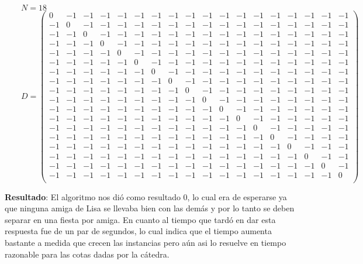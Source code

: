 \begin{flushleft}
$\qquad N = 18$\\[10pt]
$\qquad D = \left( \begin{smallmatrix}
0 & -1 & -1 & -1 & -1 & -1 & -1 & -1 & -1 & -1 & -1 & -1 & -1 & -1 & -1 & -1 & -1 & -1 \\
-1 & 0 & -1 & -1 & -1 & -1 & -1 & -1 & -1 & -1 & -1 & -1 & -1 & -1 & -1 & -1 & -1 & -1 \\
-1 & -1 & 0 & -1 & -1 & -1 & -1 & -1 & -1 & -1 & -1 & -1 & -1 & -1 & -1 & -1 & -1 & -1 \\
-1 & -1 & -1 & 0 & -1 & -1 & -1 & -1 & -1 & -1 & -1 & -1 & -1 & -1 & -1 & -1 & -1 & -1 \\
-1 & -1 & -1 & -1 & 0 & -1 & -1 & -1 & -1 & -1 & -1 & -1 & -1 & -1 & -1 & -1 & -1 & -1 \\
-1 & -1 & -1 & -1 & -1 & 0 & -1 & -1 & -1 & -1 & -1 & -1 & -1 & -1 & -1 & -1 & -1 & -1 \\
-1 & -1 & -1 & -1 & -1 & -1 & 0 & -1 & -1 & -1 & -1 & -1 & -1 & -1 & -1 & -1 & -1 & -1 \\
-1 & -1 & -1 & -1 & -1 & -1 & -1 & 0 & -1 & -1 & -1 & -1 & -1 & -1 & -1 & -1 & -1 & -1 \\
-1 & -1 & -1 & -1 & -1 & -1 & -1 & -1 & 0 & -1 & -1 & -1 & -1 & -1 & -1 & -1 & -1 & -1 \\
-1 & -1 & -1 & -1 & -1 & -1 & -1 & -1 & -1 & 0 & -1 & -1 & -1 & -1 & -1 & -1 & -1 & -1 \\
-1 & -1 & -1 & -1 & -1 & -1 & -1 & -1 & -1 & -1 & 0 & -1 & -1 & -1 & -1 & -1 & -1 & -1 \\
-1 & -1 & -1 & -1 & -1 & -1 & -1 & -1 & -1 & -1 & -1 & 0 & -1 & -1 & -1 & -1 & -1 & -1 \\
-1 & -1 & -1 & -1 & -1 & -1 & -1 & -1 & -1 & -1 & -1 & -1 & 0 & -1 & -1 & -1 & -1 & -1 \\
-1 & -1 & -1 & -1 & -1 & -1 & -1 & -1 & -1 & -1 & -1 & -1 & -1 & 0 & -1 & -1 & -1 & -1 \\
-1 & -1 & -1 & -1 & -1 & -1 & -1 & -1 & -1 & -1 & -1 & -1 & -1 & -1 & 0 & -1 & -1 & -1 \\
-1 & -1 & -1 & -1 & -1 & -1 & -1 & -1 & -1 & -1 & -1 & -1 & -1 & -1 & -1 & 0 & -1 & -1 \\
-1 & -1 & -1 & -1 & -1 & -1 & -1 & -1 & -1 & -1 & -1 & -1 & -1 & -1 & -1 & -1 & 0 & -1 \\
-1 & -1 & -1 & -1 & -1 & -1 & -1 & -1 & -1 & -1 & -1 & -1 & -1 & -1 & -1 & -1 & -1 & 0 \\
\end{smallmatrix} \right)$
\end{flushleft}

\textbf{Resultado}: El algoritmo nos dió como resultado 0, lo cual era de esperarse ya que ninguna amiga de Lisa 
se llevaba bien con las demás y por lo tanto se deben separar en una fiesta por amiga. En cuanto al tiempo que 
tardó en dar esta respuesta fue de un par de segundos, lo cual indica que el tiempo aumenta bastante a medida 
que crecen las instancias pero aún asi lo resuelve en tiempo razonable para las cotas dadas por la cátedra.
